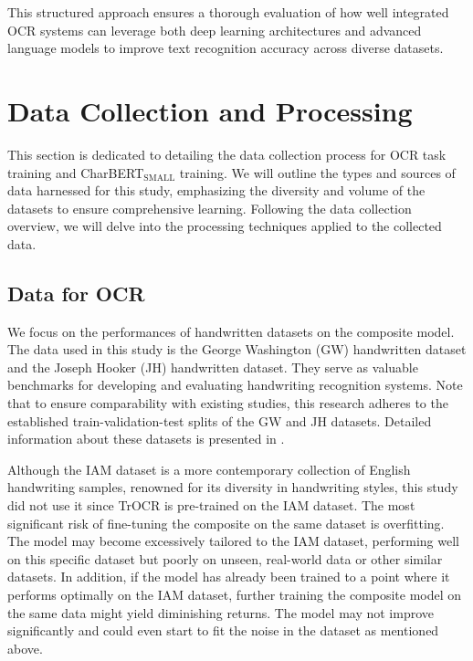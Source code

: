 This structured approach ensures a thorough evaluation of how well integrated OCR systems can leverage both deep learning architectures and advanced language models to improve text recognition accuracy across diverse datasets.
\section{Data Collection and Processing}
\label{sec:3_data_collection_and_processing}
This section is dedicated to detailing the data collection process for OCR task training and CharBERT$_{\text{SMALL}}$ training. We will outline the types and sources of data harnessed for this study, emphasizing the diversity and volume of the datasets to ensure comprehensive learning. Following the data collection overview, we will delve into the processing techniques applied to the collected data.
\subsection{Data for OCR} 
\label{subsec:3_data_for_ocr}
We focus on the performances of handwritten datasets on the composite model. The data used in this study is the George Washington (GW) handwritten dataset and the Joseph Hooker (JH) handwritten dataset. They serve as valuable benchmarks for developing and evaluating handwriting recognition systems. Note that to ensure comparability with existing studies, this research adheres to the established train-validation-test splits of the GW and JH datasets. Detailed information about these datasets is presented in .

Although the IAM dataset is a more contemporary collection of English handwriting samples, renowned for its diversity in handwriting styles, this study did not use it since TrOCR is pre-trained on the IAM dataset. The most significant risk of fine-tuning the composite on the same dataset is overfitting. The model may become excessively tailored to the IAM dataset, performing well on this specific dataset but poorly on unseen, real-world data or other similar datasets. In addition, if the model has already been trained to a point where it performs optimally on the IAM dataset, further training the composite model on the same data might yield diminishing returns. The model may not improve significantly and could even start to fit the noise in the dataset as mentioned above.


